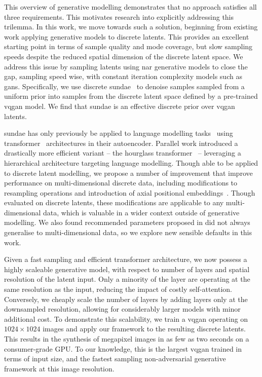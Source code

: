 This overview of generative modelling demonstrates that no approach satisfies
all three requirements. This motivates research into explicitly addressing this
trilemma. In this work, we move towards such a solution, beginning from existing
work applying generative models to discrete latents. This provides an excellent
starting point in terms of sample quality and mode coverage, but slow sampling
speeds despite the reduced spatial dimension of the discrete latent space. We
address this issue by sampling latents using \gls{nar} generative models to
close the gap, sampling speed wise, with constant iteration complexity models
such as \glspl{gan}. Specifically, we use discrete
\gls{sundae}~\cite{savinov2022stepunrolled} to denoise samples sampled from a
uniform prior into samples from the discrete latent space defined by a
pre-trained \gls{vqgan} model. We find that \gls{sundae} is an effective
discrete prior over \gls{vqgan} latents.

\Gls{sundae} has only previously be applied to language modelling
tasks~\cite{savinov2022stepunrolled} using
transformer~\cite{vaswani2017attention} architectures in their autoencoder.
Parallel work introduced a drastically more efficient variant -- the hourglass
transformer~\cite{nawrot2021hierarchical} -- leveraging a hierarchical
architecture targeting language modelling. Though able to be applied to discrete
latent modelling, we propose a number of improvement that improve performance on
multi-dimensional discrete data, including modifications to resampling
operations and introduction of axial positional
embeddings~\cite{su2021roformer}. Though evaluated on discrete latents, these
modifications are applicable to any multi-dimensional data,
which is valuable in a wider context outside of generative modelling. We
also found recommended parameters proposed in \citet{savinov2022stepunrolled}
did not always generalise to multi-dimensional data, so we explore new sensible
defaults in this work.

Given a fast sampling and efficient transformer architecture, we now possess a
highly scaleable generative model, with respect to number of layers and spatial
resolution of the latent input. Only a minority of the layer are operating at
the same resolution as the input, reducing the impact of costly self-attention.
Conversely, we cheaply scale the number of layers by adding layers only at the
downsampled resolution, allowing for considerably larger models with minor
additional cost. To demonstrate this scalability, we train a \gls{vqgan}
operating on $1024 \times 1024$ images and apply our framework to the resulting
discrete latents. This results in the synthesis of megapixel
images in as few as two seconds on a consumer-grade GPU. To our knowledge, this is
the largest \gls{vqgan} trained in terms of input size, and the fastest
sampling non-adversarial generative framework at this image resolution.


